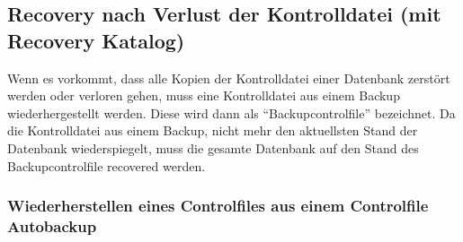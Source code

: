       \subsection{Recovery nach Verlust der Kontrolldatei (mit Recovery Katalog)}
        \label{recoverywithabackupcontrolfile}
        Wenn es vorkommt, dass alle Kopien der Kontrolldatei einer Datenbank zerstört werden oder verloren gehen, muss eine Kontrolldatei aus einem Backup wiederhergestellt werden. Diese wird dann als \enquote{Backupcontrolfile} bezeichnet. Da die Kontrolldatei aus einem Backup, nicht mehr den aktuellsten Stand der Datenbank wiederspiegelt, muss die gesamte Datenbank auf den Stand des Backupcontrolfile recovered werden.
        \subsubsection{Wiederherstellen eines Controlfiles aus einem Controlfile Autobackup}

